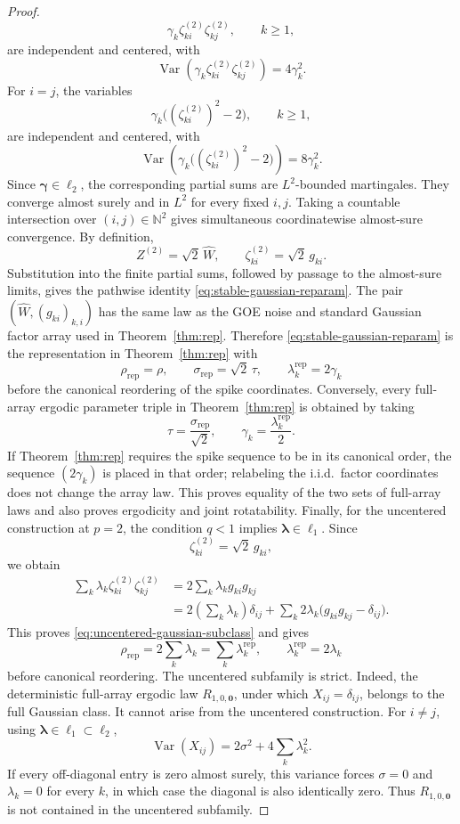 \begin{proof}
\[
\gamma_k\zeta^{(2)}_{ki}\zeta^{(2)}_{kj},
\qquad k\geq1,
\]
are independent and centered, with
\[
\operatorname{Var}
\left(
 \gamma_k\zeta^{(2)}_{ki}\zeta^{(2)}_{kj}
\right)
=
4\gamma_k^2.
\]
For \(i=j\), the variables
\[
\gamma_k\bigl((\zeta^{(2)}_{ki})^2-2\bigr),
\qquad k\geq1,
\]
are independent and centered, with
\[
\operatorname{Var}
\left(
 \gamma_k\bigl((\zeta^{(2)}_{ki})^2-2\bigr)
\right)
=
8\gamma_k^2.
\]
Since \(\boldsymbol\gamma\in\ell_2\), the corresponding partial sums
are \(L^2\)-bounded martingales. They converge almost surely and in
\(L^2\) for every fixed \(i,j\). Taking a countable intersection over
\((i,j)\in\mathbb N^2\) gives simultaneous coordinatewise
almost-sure convergence.
By definition,
\[
Z^{(2)}=\sqrt2\,\widehat W,
\qquad
\zeta^{(2)}_{ki}=\sqrt2\,g_{ki}.
\]
Substitution into the finite partial sums, followed by passage to the
almost-sure limits, gives the pathwise identity
\eqref{eq:stable-gaussian-reparam}. The pair
\((\widehat W,(g_{ki})_{k,i})\) has the same law as the GOE noise and
standard Gaussian factor array used in Theorem~\ref{thm:rep}.
Therefore \eqref{eq:stable-gaussian-reparam} is the representation in
Theorem~\ref{thm:rep} with
\[
\rho_{\mathrm{rep}}=\rho,
\qquad
\sigma_{\mathrm{rep}}=\sqrt2\,\tau,
\qquad
\lambda_k^{\mathrm{rep}}=2\gamma_k
\]
before the canonical reordering of the spike coordinates.
Conversely, every full-array ergodic parameter triple in
Theorem~\ref{thm:rep} is obtained by taking
\[
\tau=\frac{\sigma_{\mathrm{rep}}}{\sqrt2},
\qquad
\gamma_k=\frac{\lambda_k^{\mathrm{rep}}}{2}.
\]
If Theorem~\ref{thm:rep} requires the spike sequence to be in its
canonical order, the sequence \((2\gamma_k)\) is placed in that order;
relabeling the i.i.d.\ factor coordinates does not change the array
law. This proves equality of the two sets of full-array laws and also
proves ergodicity and joint rotatability.
Finally, for the uncentered construction at \(p=2\), the condition
\(q<1\) implies \(\boldsymbol\lambda\in\ell_1\). Since
\[
\zeta^{(2)}_{ki}=\sqrt2\,g_{ki},
\]
we obtain
\begin{align*}
\sum_k
\lambda_k\zeta^{(2)}_{ki}\zeta^{(2)}_{kj}
&=
2\sum_k\lambda_kg_{ki}g_{kj}                               \\
&=
2\left(\sum_k\lambda_k\right)\delta_{ij}
+
\sum_k2\lambda_k
 \bigl(g_{ki}g_{kj}-\delta_{ij}\bigr).
\end{align*}
This proves \eqref{eq:uncentered-gaussian-subclass} and gives
\[
\rho_{\mathrm{rep}}
=
2\sum_k\lambda_k
=
\sum_k\lambda_k^{\mathrm{rep}},
\qquad
\lambda_k^{\mathrm{rep}}=2\lambda_k
\]
before canonical reordering.
The uncentered subfamily is strict. Indeed, the deterministic
full-array ergodic law \(R_{1,0,\boldsymbol 0}\), under which
\(X_{ij}=\delta_{ij}\), belongs to the full Gaussian class. It cannot
arise from the uncentered construction. For \(i\neq j\), using
\(\boldsymbol\lambda\in\ell_1\subset\ell_2\),
\[
\operatorname{Var}(X_{ij})
=
2\sigma^2
+
4\sum_k\lambda_k^2.
\]
If every off-diagonal entry is zero almost surely, this variance
forces \(\sigma=0\) and \(\lambda_k=0\) for every \(k\), in which case
the diagonal is also identically zero. Thus
\(R_{1,0,\boldsymbol 0}\) is not contained in the uncentered
subfamily.
\end{proof}

